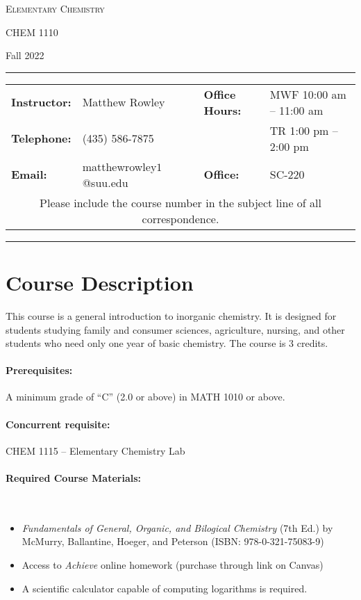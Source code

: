 \documentclass[12pt, letterpaper]{article}
\begin{document}
\begin{center}
	{\Large \textsc{Elementary Chemistry}}

	CHEM 1110
\end{center}
\begin{center}
	{\large Fall 2022}
\end{center}
\begin{center}
	\rule{0.99\textwidth}{0.4pt}
	\begin{tabular}{llcll}
		\textbf{Instructor:} & Matthew Rowley           &  & \textbf{Office Hours:} & MWF 10:00 am -- 11:00 am \\
		\textbf{Telephone:}  & (435) 586-7875           &  &                        & TR 1:00 pm -- 2:00 pm    \\
		\textbf{Email:}      & matthewrowley$1$@suu.edu &  & \textbf{Office:}       & SC-220                   \\
		\multicolumn{5}{c}{Please include the course number in the subject line of all correspondence.}
	\end{tabular}
	\rule{0.99\textwidth}{0.4pt}
\end{center}

\section*{Course Description}
This course is a general introduction to inorganic chemistry. It is designed for students studying family and consumer sciences, agriculture, nursing, and other students who need only one year of basic chemistry. The course is 3 credits.

\paragraph{Prerequisites:}
A minimum grade of ``C'' (2.0 or above) in MATH 1010 or above.

\paragraph{Concurrent requisite:}
CHEM 1115 -- Elementary Chemistry Lab

\paragraph{Required Course Materials:} ~

\begin{itemize}
	\item \emph{Fundamentals of General, Organic, and Bilogical Chemistry} (7th Ed.) by McMurry, Ballantine, Hoeger, and Peterson (ISBN: 978-0-321-75083-9)
	\item Access to \emph{Achieve} online homework (purchase through link on Canvas)
	\item A scientific calculator capable of computing logarithms is required.
\end{itemize}
\end{document}
